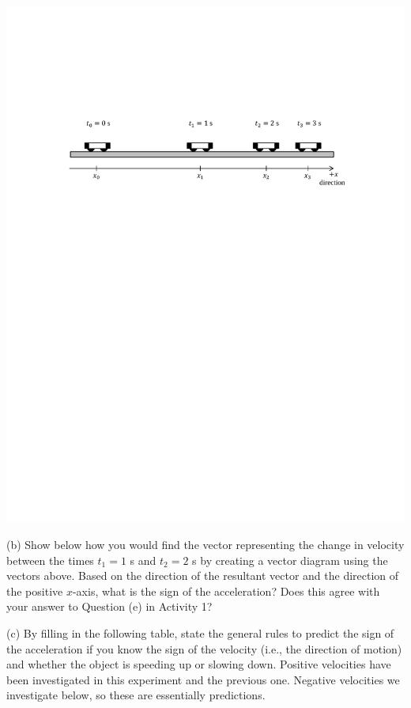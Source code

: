 \vspace{0.5cm}
{\par\centering \includegraphics{slowing/carts_slowing.pdf} \par}
\vspace{0.5cm}

(b) Show below how you would find the vector representing the change in velocity
between the times $t_1 = 1$ s and $t_2 = 2$ s by creating a vector diagram using the vectors above. Based on the direction of the resultant vector and the direction of the positive $x$-axis, what is the sign of the acceleration? Does this agree with your answer to Question (e) in Activity 1?
\answerspace{25mm}

(c) By filling in the following table, state the general rules to predict the 
sign of the acceleration if you know the sign of the velocity (i.e., the 
direction of motion) and whether the object is speeding up or slowing down. 
Positive velocities have been investigated in this experiment and the previous 
one. Negative velocities we investigate below, so these are essentially 
predictions.

